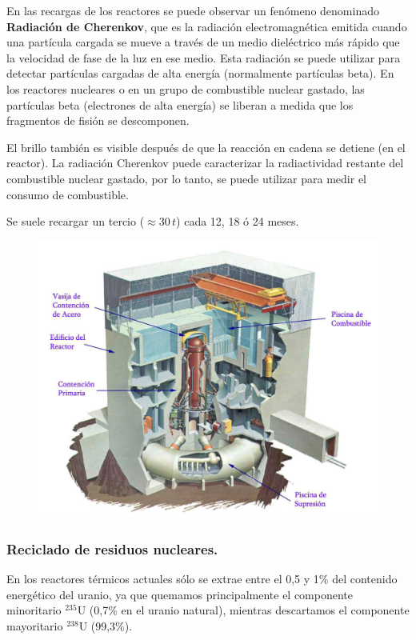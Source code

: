 			
			En las recargas de los reactores se puede observar un fenómeno denominado \textbf{Radiación de Cherenkov}, que es la radiación electromagnética emitida cuando una partícula cargada se mueve a través de un medio dieléctrico más rápido que la velocidad de fase de la luz en ese medio. Esta radiación se puede utilizar para detectar partículas cargadas de alta energía (normalmente partículas beta). En los reactores nucleares o en un grupo de combustible nuclear gastado, las partículas beta (electrones de alta energía) se liberan a medida que los fragmentos de fisión se descomponen.
			
			
			El brillo también es visible después de que la reacción en
			cadena se detiene (en el reactor). La radiación Cherenkov
			puede caracterizar la radiactividad restante del combustible
			nuclear gastado, por lo tanto, se puede utilizar para medir
			el consumo de combustible.
			
			
			Se suele recargar un tercio ($\approx 30\,t$) cada 12, 18 ó 24 meses.
			
			\begin{figure}[H]
				\centering
				\includegraphics[width=0.8\linewidth]{res/tema1/interiorReactor}
			\end{figure}
			
		\subsubsection{Reciclado de residuos nucleares.}
			En los reactores térmicos actuales sólo se extrae entre el 0,5 y 1\% del contenido energético del uranio, ya que quemamos principalmente el componente minoritario $^{235}$U (0,7\% en el uranio natural), mientras descartamos el componente mayoritario $^{238}$U (99,3\%).
			
